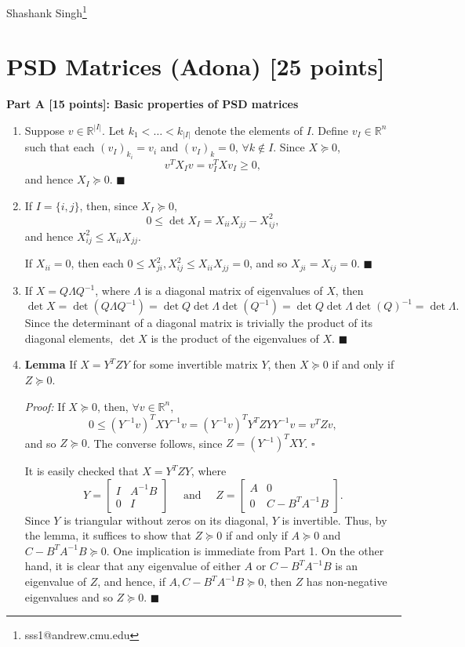 \documentclass[11pt]{article}
\newcommand{\inv}{^{-1}}
\newcommand{\R}{\mathbb{R}}
\renewcommand{\qed}{\quad \ensuremath{\blacksquare}}
\begin{document}
Shashank Singh\footnote{sss1@andrew.cmu.edu}
\setcounter{section}{1}
\section{PSD Matrices (Adona) [25 points]}
\textbf{Part A [15 points]: Basic properties of PSD matrices} 
\begin{enumerate}
\item Suppose $v \in \R^{|I|}$. Let $k_1 < \dots < k_{|I|}$ denote the elements
of $I$. Define $v_I \in \R^n$ such that each $(v_I)_{k_i} = v_i$ and
$(v_I)_k = 0$, $\forall k \notin I$. Since $X \succeq 0$,
\[v^T X_I v = v_I^T X v_I \geq 0,\]
and hence $X_I \succeq 0$. \qed

\item If $I = \{i,j\}$, then, since $X_I \succeq 0$,
\[0 \leq \det X_I = X_{ii}X_{jj} - X_{ij}^2,\]
and hence $X_{ij}^2 \leq X_{ii}X_{jj}$.

If $X_{ii} = 0$, then each $0 \leq X_{ji}^2, X_{ij}^2 \leq X_{ii}X_{jj} = 0$,
and so $X_{ji} = X_{ij} = 0$. \qed

\item If $X = Q \Lambda Q\inv$, where $\Lambda$ is a diagonal matrix of
eigenvalues of $X$, then
\[\det X
    = \det (Q \Lambda Q\inv)
    = \det Q \det \Lambda \det(Q\inv)
    = \det Q \det \Lambda \det(Q)\inv
    = \det \Lambda.
\]
Since the determinant of a diagonal matrix is trivially the product of its
diagonal elements, $\det X$ is the product of the eigenvalues of $X$. \qed

\item {\bf Lemma} If $X = Y^TZY$ for some invertible matrix $Y$, then
$X \succeq 0$ if and only if $Z \succeq 0$.

\emph{Proof:} If $X \succeq 0$, then, $\forall v \in \R^n$,
\[0
    \leq (Y\inv v)^TXY\inv v
    = (Y\inv v)^TY^TZYY\inv v
    = v^TZv,
\]
and so $Z \succeq 0$. The converse follows, since $Z = (Y\inv)^TXY$.
\quad $\square$

It is easily checked that $X = Y^TZY$, where
\[Y =
\begin{bmatrix}
    I   &   A\inv B \\
    0   &   I
\end{bmatrix}
\quad \mbox{ and } \quad
Z =
\begin{bmatrix}
    A   &   0   \\
    0   &   C - B^T A\inv B
\end{bmatrix}.
\]
Since $Y$ is triangular without zeros on its diagonal, $Y$ is invertible. Thus,
by the lemma, it suffices to show that $Z \succeq 0$ if and only if
$A \succeq 0$ and $C - B^T A\inv B \succeq 0$. One implication is immediate
from Part 1. On the other hand, it is clear that any eigenvalue of either $A$
or $C - B^T A\inv B$ is an eigenvalue of $Z$, and hence, if
$A, C - B^T A\inv B \succeq 0$, then $Z$ has non-negative eigenvalues and so
$Z \succeq 0$. \qed
\end{enumerate}
\end{document}
